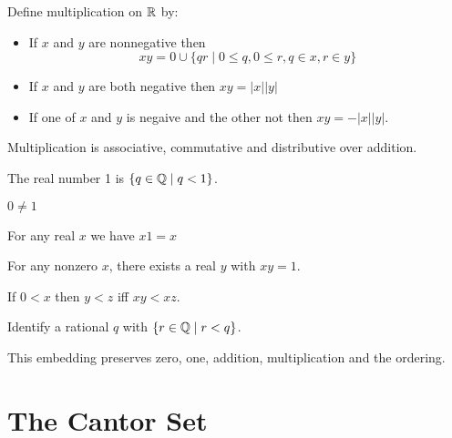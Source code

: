 \begin{definition}
    Define multiplication on $\mathbb{R}$ by:
    \begin{itemize}
        \item If $x$ and $y$ are nonnegative then
        \[ xy = 0 \cup \{ qr \mid 0 \leq q, 0 \leq r, q \in x, r \in y \} \]
        \item If $x$ and $y$ are both negative then $xy = |x| |y|$
        \item If one of $x$ and $y$ is negaive and the other not then $xy = -|x| |y|$.
    \end{itemize}
\end{definition}

\begin{theorem}
    Multiplication is associative, commutative and distributive over addition.
\end{theorem}

\begin{definition}
    The real number 1 is $\{ q \in \mathbb{Q} \mid q < 1 \}$.
\end{definition}

\begin{theorem}
    $0 \neq 1$
\end{theorem}

\begin{theorem}
    For any real $x$ we have $x1 = x$
\end{theorem}

\begin{theorem}
    For any nonzero $x$, there exists a real $y$ with $xy = 1$.
\end{theorem}

\begin{theorem}
    If $0 < x$ then $y < z$ iff $xy < xz$.
\end{theorem}

\begin{definition}
    Identify a rational $q$ with $\{ r \in \mathbb{Q} \mid r < q \}$.
\end{definition}

\begin{theorem}
    This embedding preserves zero, one, addition, multiplication and the ordering.
\end{theorem}

\section{The Cantor Set}

